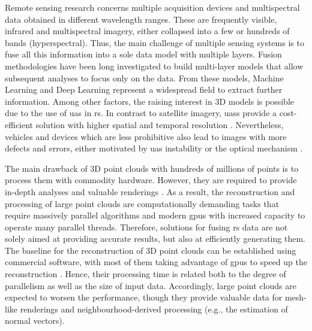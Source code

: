 Remote sensing research concerns multiple acquisition devices and multispectral data obtained in different wavelength ranges. These are frequently visible, infrared and multispectral imagery, either collapsed into a few or hundreds of bands (hyperspectral). Thus, the main challenge of multiple sensing systems is to fuse all this information into a sole data model with multiple layers. Fusion methodologies have been long investigated to build multi-layer models that allow subsequent analyses to focus only on the data. From these models, Machine Learning \cite{padua_vineyard_2022} and Deep Learning \cite{jia_survey_2021, hu_hyperspectral_2022} represent a widespread field to extract further information. Among other factors, the raising interest in 3D models is possible due to the use of \acrshort{uas} in \acrshort{rs}. In contrast to satellite imagery, \acrshort{uas}s provide a cost-efficient solution with higher spatial and temporal resolution \cite{singh_bibliometric_2022}. Nevertheless, vehicles and devices which are less prohibitive also lead to images with more defects and errors, either motivated by \acrshort{uas} instability \cite{akhoundi_khezrabad_new_2022} or the optical mechanism \cite{mohamad_screening_2021}. 

The main drawback of 3D point clouds with hundreds of millions of points is to process them with commodity hardware. However, they are required to provide in-depth analyses and valuable renderings \cite{schutz_rendering_2021}. As a result, the reconstruction and processing of large point clouds are computationally demanding tasks that require massively parallel algorithms and modern \acrshort{gpu}s with increased capacity to operate many parallel threads. Therefore, solutions for fusing \acrshort{rs} data are not solely aimed at providing accurate results, but also at efficiently generating them. The baseline for the reconstruction of 3D point clouds can be established using commercial software, with most of them taking advantage of \acrshort{gpu}s to speed up the reconstruction \cite{jiang_efficient_2020}. Hence, their processing time is related both to the degree of parallelism as well as the size of input data. Accordingly, large point clouds are expected to worsen the performance, though they provide valuable data for mesh-like renderings and neighbourhood-derived processing (e.g., the estimation of normal vectors).   

